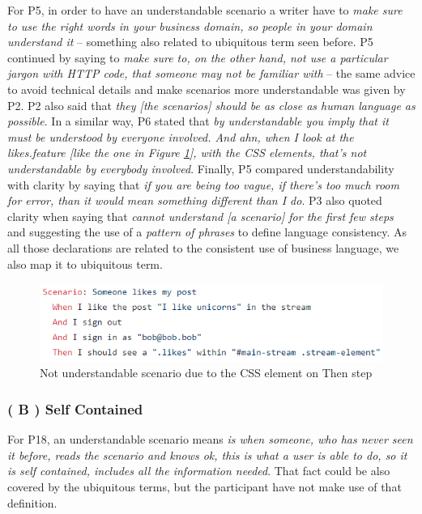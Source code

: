 For P5, in order to have an understandable scenario a writer have to \textit{make sure to use the right words in your business domain, so people in your domain understand it} -- something also related to ubiquitous term seen before. P5 continued by saying to  \textit{make sure to, on the other hand, not use a particular jargon with HTTP code, that someone may not be familiar with} -- the same advice to avoid technical details and make scenarios more understandable was given by P2. P2 also said that \textit{they [the scenarios] should be as close as human language as possible}. In a similar way, P6 stated that \textit{by understandable you imply that it must be understood by everyone involved. And ahn, when I look at the likes.feature [like the one in Figure \ref{fig:not_understandable_due_to_technical_jargon}], with the CSS elements, that's not understandable by everybody involved}. Finally, P5 compared understandability with clarity by saying that \textit{if you are being too vague, if there's too much room for error, than it would mean something different than I do}. P3 also quoted clarity when saying that \textit{cannot understand [a scenario] for the first few steps} and suggesting the use of a \textit{pattern of phrases} to define language consistency. As all those declarations are related to the consistent use of business language, we also map it to ubiquitous term.

\begin{figure}[t]
	\centering
	\includegraphics[scale=0.8]{images/likes_feature_understandable_example_P6}
	\caption[\hspace{2mm}Not understandable scenario due to the CSS element]{Not understandable scenario due to the CSS element on Then step}
	\label{fig:not_understandable_due_to_technical_jargon}
\end{figure}

\subsubsection{\textbf{( B ) Self Contained}}
For P18, an understandable scenario means \textit{is when someone, who has never seen it before, reads the scenario and knows \textit{ok, this is what a user is able to do}, so it is self contained, includes all the information needed}. That fact could be also covered by the ubiquitous terms, but the participant have not make use of that definition.

